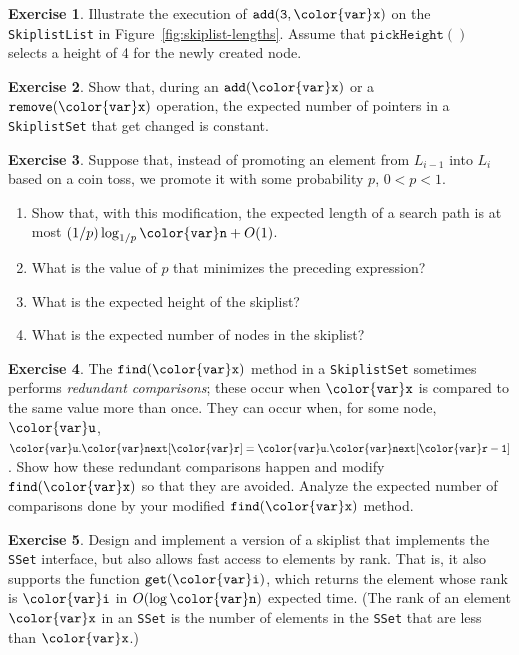 \documentclass[10pt]{book}
\newcommand{\figref}[1]{Figure~\ref{fig:#1}}
\theoremstyle{plain}
\theoremstyle{definition}
\newtheorem{exc}{Exercise}[chapter]
\newcommand{\exclabel}[1]{\label{exc:#1}}
\begin{document}
\begin{exc}
  Illustrate the execution of \ensuremath{\mathtt{add(3,{\color{var}x})}} on the \texttt{SkiplistList}
  in \figref{skiplist-lengths}.  Assume that \ensuremath{\mathtt{pickHeight()}} selects a height
  of 4 for the newly created node.
\end{exc}

\begin{exc}\exclabel{skiplist-changes}
  Show that, during an \ensuremath{\mathtt{add({\color{var}x})}} or a \ensuremath{\mathtt{remove({\color{var}x})}} operation, the expected
  number of pointers in a \texttt{SkiplistSet} that get changed is constant.
\end{exc}

\begin{exc}\exclabel{skiplist-opt}
  Suppose that, instead of promoting an element from $L_{i-1}$ into $L_i$
  based on a coin toss, we promote it with some probability $p$, $0 <
  p < 1$.
  \begin{enumerate}
   \item Show that, with this modification, the expected length of a
     search path is at most $(1/p)\log_{1/p} \ensuremath{\mathtt{{\color{var}n}}} + O(1)$.
   \item What is the value of $p$ that minimizes the preceding expression?
   \item What is the expected height of the skiplist? 
   \item What is the expected number of nodes in the skiplist?
  \end{enumerate}
\end{exc}


\begin{exc}\exclabel{skiplist-opt-2}
  The \ensuremath{\mathtt{find({\color{var}x})}} method in a \texttt{SkiplistSet} sometimes performs
  \emph{redundant comparisons}; these occur when \ensuremath{\mathtt{{\color{var}x}}} is compared to the
  same value more than once.  They can occur when, for some node, \ensuremath{\mathtt{{\color{var}u}}},
  $\ensuremath{\mathtt{{\color{var}u}.{\color{var}next}[{\color{var}r}]}} = \ensuremath{\mathtt{{\color{var}u}.{\color{var}next}[{\color{var}r}-1]}}$.  Show how these redundant comparisons
  happen and modify \ensuremath{\mathtt{find({\color{var}x})}} so that they are avoided.  Analyze the
  expected number of comparisons done by your modified \ensuremath{\mathtt{find({\color{var}x})}} method.
\end{exc}

\begin{exc}
  Design and implement a version of a skiplist that implements the
  \texttt{SSet} interface, but also allows fast access to elements by rank.
  That is, it also supports the function \ensuremath{\mathtt{get({\color{var}i})}}, which returns the
  element whose rank is \ensuremath{\mathtt{{\color{var}i}}} in $O(\log \ensuremath{\mathtt{{\color{var}n}}})$ expected time. (The rank
  of an element \ensuremath{\mathtt{{\color{var}x}}} in an \texttt{SSet} is the number of elements in the \texttt{SSet}
  that are less than \ensuremath{\mathtt{{\color{var}x}}}.)
\end{exc}
\end{document}
